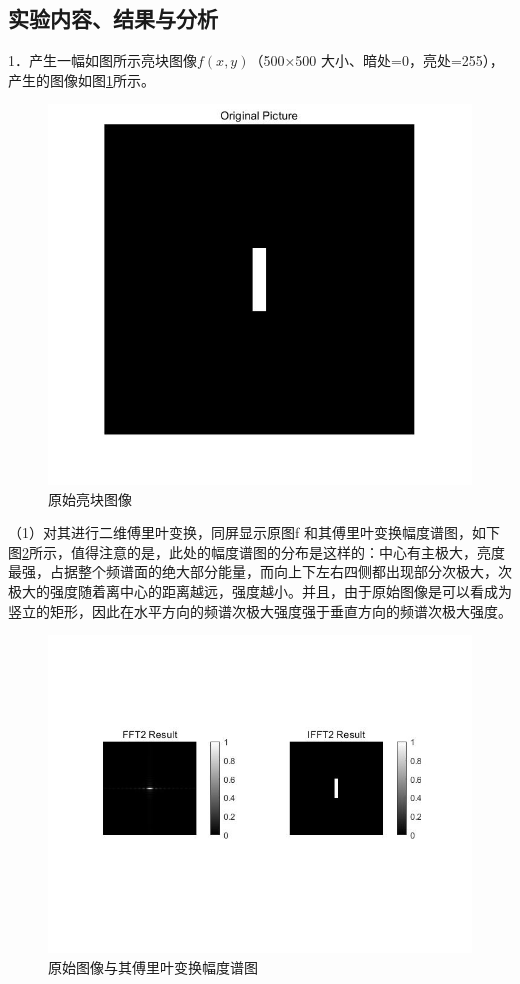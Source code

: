 \documentclass[UTF8]{article} %
\begin{document}
	\subsection{实验内容、结果与分析}
	1．产生一幅如图所示亮块图像$f(x,y)$（500×500 大小、暗处=0，亮处=255），产生的图像如图\ref{fig:2-1}所示。
	\begin{figure}[H]
		\centering
		\includegraphics[width=0.5\linewidth]{2-1}
		\caption{原始亮块图像}
		\label{fig:2-1}
	\end{figure}
	
	（1）对其进行二维傅里叶变换，同屏显示原图f 和其傅里叶变换幅度谱图，如下图\ref{fig:2-2}所示，值得注意的是，此处的幅度谱图的分布是这样的：中心有主极大，亮度最强，占据整个频谱面的绝大部分能量，而向上下左右四侧都出现部分次极大，次极大的强度随着离中心的距离越远，强度越小。并且，由于原始图像是可以看成为竖立的矩形，因此在水平方向的频谱次极大强度强于垂直方向的频谱次极大强度。
	\begin{figure}[H]
		\centering
		\includegraphics[width=0.7\linewidth]{2-2}
		\caption{原始图像与其傅里叶变换幅度谱图}
		\label{fig:2-2}
	\end{figure}
	
\end{document}
